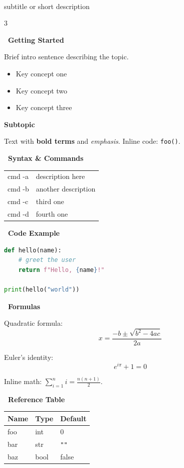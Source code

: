 \documentclass[8pt,landscape,a4paper]{extarticle}
\newcommand{\cheatsection}[1]{%
  \vspace{6pt}%
  \noindent\colorbox{headerblue}{%
    \parbox[c][1.05em][c]{\dimexpr\linewidth-2\fboxsep\relax}{%
      \color{white}\bfseries\ #1%
    }%
  }\par\vspace{3pt}%
}
\newcommand{\cheatsub}[1]{%
  \vspace{3pt}%
  {\color{headerblue}\bfseries #1}\par\vspace{1pt}%
}
\begin{document}
\noindent\colorbox{headerblue}{%
  \parbox{\dimexpr\textwidth-2\fboxsep\relax}{%
    \vspace{3pt}
    \\[1pt]
    {\small\color{white!85} subtitle or short description}
    \vspace{3pt}
  }%
}
\vspace{4pt}

\begin{multicols}{3}

\cheatsection{Getting Started}
Brief intro sentence describing the topic.
\begin{itemize}
  \item Key concept one
  \item Key concept two
  \item Key concept three
\end{itemize}

\cheatsub{Subtopic}
Text with \textbf{bold terms} and \emph{emphasis}. Inline code: \texttt{foo()}.

\cheatsection{Syntax \& Commands}
\begin{tabular}{@{}>{\ttfamily}l l@{}}
cmd -a & description here \\
cmd -b & another description \\
cmd -c & third one \\
cmd -d & fourth one \\
\end{tabular}

\cheatsection{Code Example}
\begin{lstlisting}[language=Python]
def hello(name):
    # greet the user
    return f"Hello, {name}!"

print(hello("world"))
\end{lstlisting}

\cheatsection{Formulas}
Quadratic formula:
\[ x = \frac{-b \pm \sqrt{b^2 - 4ac}}{2a} \]

Euler's identity:
\[ e^{i\pi} + 1 = 0 \]

Inline math: $\sum_{i=1}^{n} i = \frac{n(n+1)}{2}$.

\cheatsection{Reference Table}
\begin{tabular}{@{}lll@{}}
\toprule
\textbf{Name} & \textbf{Type} & \textbf{Default} \\
\midrule
foo & int  & 0 \\
bar & str  & \texttt{""} \\
baz & bool & false \\
\bottomrule
\end{tabular}


\end{multicols}
\end{document}
